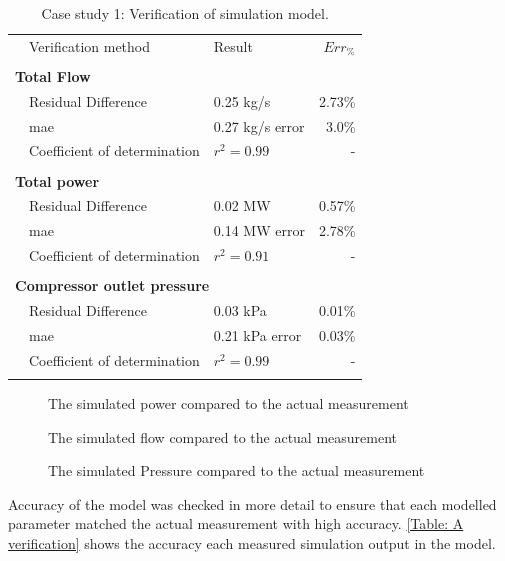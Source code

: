 \begin{table}[h!]
	\label{Beet verification table}
	\centering
	\begin{tabular}{p{0.5cm}p{8cm}p{5cm}r}
		\hline
		&Verification method & Result & $Err_{\%}$\\
		\hhline{====}
		\\ \multicolumn{4}{l}{\textbf{ Total Flow}}\\
		&Residual Difference          & 0.25 kg/s  & 2.73\% \\
		&\gls{mae} 					 & 0.27 kg/s error & 3.0\% \\
		&Coefficient of determination & $r^2 =0.99$   & -\\ 
		\\ \multicolumn{4}{l}{\textbf{ Total power}}\\
		&Residual Difference          & 0.02 MW  & 0.57\% \\
		&\gls{mae} 					 & 0.14 MW error & 2.78\% \\
		 &Coefficient of determination & $r^2 =0.91$   & -\\ 
		\\ \multicolumn{4}{l}{\textbf{ Compressor outlet pressure}}\\
		&Residual Difference          &0.03 kPa   & 0.01\% \\
		&\gls{mae} 					 & 0.21 kPa error & 0.03\% \\
		&Coefficient of determination & $r^2 =0.99$   & -\\
	\\ 	\hline
	\end{tabular} 
	\caption{Case study 1: Verification of simulation model.}
\end{table}
\begin{figure}[h!]
	\centering
	
	\caption{The simulated power compared to the actual measurement}
	\label{fig: Verification power Beatrix}
\end{figure}
\begin{figure}[h!]
	\centering
	
	\caption{The simulated flow compared to the actual measurement}
	\label{fig: Verification flow Beatrix}
\end{figure}
\begin{figure}[h!]
	\centering
	
	\caption{The simulated Pressure compared to the actual measurement}
	\label{fig: Verification Pressure Beatrix}
\end{figure}
\par
Accuracy of the model was checked in more detail to ensure that each modelled parameter matched the actual measurement with high accuracy. \cref{Table: A verification} shows the accuracy each measured simulation output in the model.
